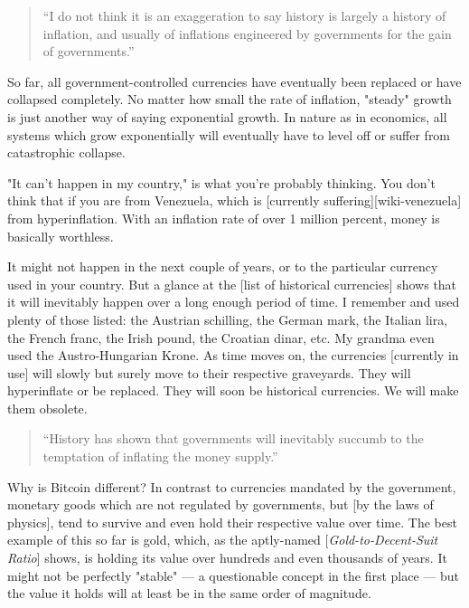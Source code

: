 \begin{quotation}
``I do not think it is an exaggeration to say history is largely a
history of inflation, and usually of inflations engineered by
governments for the gain of governments.''
\end{quotation}

So far, all government-controlled currencies have eventually been
replaced or have collapsed completely. No matter how small the rate of
inflation, "steady" growth is just another way of saying exponential
growth. In nature as in economics, all systems which grow exponentially
will eventually have to level off or suffer from catastrophic collapse.

"It can't happen in my country," is what you're probably thinking. You
don't think that if you are from Venezuela, which is [currently
suffering][wiki-venezuela] from hyperinflation. With an inflation rate of over 1 million
percent, money is basically worthless.

It might not happen in the next couple of years, or to the particular
currency used in your country. But a glance at the [list of historical
currencies] shows that it will inevitably happen over a long enough period of
time. I remember and used plenty of those listed: the Austrian
schilling, the German mark, the Italian lira, the French franc, the
Irish pound, the Croatian dinar, etc. My grandma even used the
Austro-Hungarian Krone. As time moves on, the currencies [currently in
use] will slowly but surely move to their respective graveyards. They
will hyperinflate or be replaced. They will soon be historical
currencies. We will make them obsolete.

\begin{quotation}
``History has shown that governments will inevitably succumb to the
temptation of inflating the money supply.''
\end{quotation}

Why is Bitcoin different? In contrast to currencies mandated by the
government, monetary goods which are not regulated by governments, but
[by the laws of physics], tend to survive and even hold their respective
value over time. The best example of this so far is gold, which, as the
aptly-named [\textit{Gold-to-Decent-Suit Ratio}] shows, is holding its value
over hundreds and even thousands of years. It might not be perfectly
"stable" --- a questionable concept in the first place --- but the value
it holds will at least be in the same order of magnitude.

